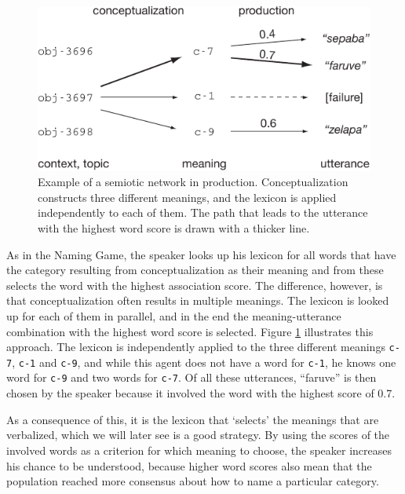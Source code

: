 \begin{figure}[t]
  \includegraphics[scale=0.8]{figures/sgg-semiotic-network-production}
  \caption{Example of a semiotic network in
    production. Conceptualization constructs three different meanings,
    and the lexicon is applied independently to each of them. The path
    that leads to the utterance with the highest word score is drawn
    with a thicker line. }
  \label{f:sgg-semiotic-network-production}
\end{figure}

 As
in the Naming Game, the speaker looks up his lexicon for all words
that have the category resulting from conceptualization as their
meaning and from these selects the word with the highest association
score. The difference, however, is that conceptualization often
results in multiple meanings. The lexicon is looked up for each of
them in parallel, and in the end the meaning-utterance combination
with the highest word score is selected. Figure
\ref{f:sgg-semiotic-network-production} illustrates this approach. The
lexicon is independently applied to the three different meanings
\texttt{c-7}, \texttt{c-1} and \texttt{c-9}, and while this agent does
not have a word for \texttt{c-1}, he knows one word for \texttt{c-9}
and two words for \texttt{c-7}. Of all these utterances, ``faruve'' is
then chosen by the speaker because it involved the word with the
highest score of 0.7.

As a consequence of this, it is the lexicon that `selects' the
meanings that are verbalized, which we will later see is a good
strategy. By using the scores of the involved words as a criterion for
which meaning to choose, the speaker increases his chance to be
understood, because higher word scores also mean that the population
reached more consensus about how to name a particular category.


